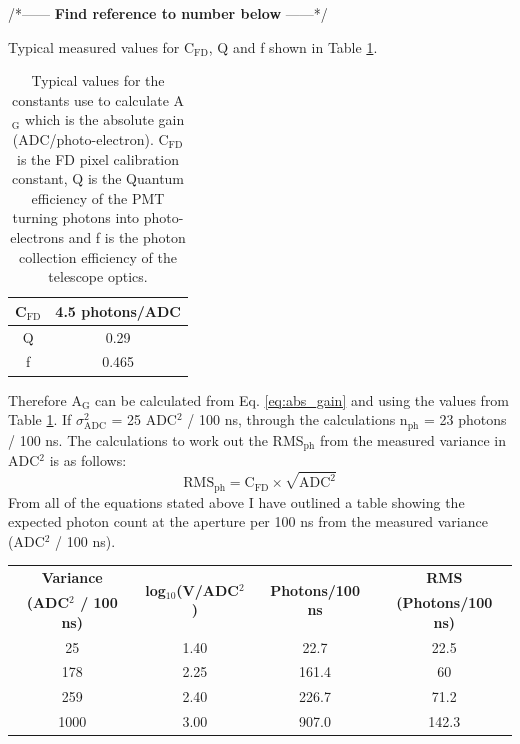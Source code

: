 /*------ \textbf{Find reference to number below} ------*/

Typical measured values for C$_{\mathrm{FD}}$, Q and f shown in Table \ref{tab:CFD_Q_F}.
\vspace{3mm}
\begin{table}[h]
\begin{center}
\begin{tabular}{|c|c|}
\hline 
C$_{\mathrm{FD}}$ & 4.5 photons/ADC \\
\hline
Q & 0.29 \\
\hline
f & 0.465 \\
\hline
\end{tabular} 
\end{center}
\caption{Typical values for the constants use to calculate A$_{\mathrm{G}}$ which is the absolute gain (ADC/photo-electron). $\mathrm{C}_{\mathrm{FD}}$ is the FD pixel calibration constant, Q is the Quantum efficiency of the PMT turning photons into photo-electrons and f is the photon collection efficiency of the telescope optics.} \label{tab:CFD_Q_F}
\end{table} 

Therefore A$_{\mathrm{G}}$ can be calculated from Eq. \ref{eq:abs_gain} and using the values from Table \ref{tab:CFD_Q_F}. If $\sigma^2_{\mathrm{ADC}}$ = 25 ADC$^2$ / 100 ns, through the calculations n$_{\mathrm{ph}}$ = 23 photons / 100 ns. The calculations to work out the RMS$_{\mathrm{ph}}$ from the measured variance in ADC$^2$ is as follows:
\begin{equation}
\mathrm{RMS}_{\mathrm{ph}} = \mathrm{C}_{\mathrm{FD}} \times \sqrt{\mathrm{ADC}^2}
\end{equation}
From all of the equations stated above I have outlined a table showing the expected photon count at the aperture per 100 ns from the measured variance (ADC$^2$ / 100 ns).
\begin{center}
\begin{tabular}{| c | c | c | c |}
\hline \hline
\textbf{Variance} & \multirow{2}{*}{\textbf{log$_{10}$(V/ADC$^2$)}} & \multirow{2}{*}{\textbf{Photons/100 ns}} & \textbf{RMS} \\
\textbf{(ADC$^2$ / 100 ns)} & & & \textbf{(Photons/100 ns)} \\
\hline \hline
25 & 1.40 & 22.7 & 22.5 \\
\hline
178 & 2.25 & 161.4 & 60 \\
\hline
259 & 2.40 & 226.7 & 71.2 \\
\hline
1000 & 3.00 & 907.0 & 142.3 \\
\hline
\end{tabular}
\end{center}


